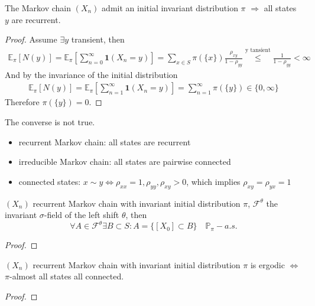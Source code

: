 \begin{theorem}
	The Markov chain $(X_n)$ admit an initial invariant distribution $\pi$ $\Rightarrow$ all states $y$ are recurrent.
\end{theorem}
\begin{proof}
	Assume $\exists y$ transient, then 
	\begin{align*}
		\mathbb{E}_\pi[N(y)] = \mathbb{E}_\pi[\sum_{n = 0}^\infty \textbf{1}(X_n = y)] = \sum_{x \in S} \pi(\{x\})\frac{\rho_{xy}}{1 - \rho_{yy}} \overset{\text{y tansient}}{\leq}\frac{1}{1-\rho_{yy}} < \infty
	\end{align*}
	And by the invariance of the initial distribution
	\begin{align*}
		\mathbb{E}_\pi[N(y)] = \mathbb{E}_\pi[\sum_{n = 1}^\infty \textbf{1}(X_n = y)] = \sum_{n = 1}^\infty \pi(\{y\}) \in \{0, \infty\}
	\end{align*}
	Therefore $\pi(\{y\}) = 0$. 
\end{proof}
\begin{remark}
The converse is not true.	
\end{remark}

\begin{definition}\quad
\begin{itemize}
	\item recurrent Markov chain: all states are recurrent
	\item irreducible Markov chain: all states are pairwise connected
	\item connected states: $x \sim y \Leftrightarrow \rho_{xx} = 1, \rho_{yy}, \rho_{xy} > 0$, which implies $\rho_{xy} = \rho_{yx}= 1$
\end{itemize}
\end{definition}

\begin{theorem}
	$(X_n)$ recurrent Markov chain with invariant initial distribution $\pi$, $\mathcal{F}^\theta$ the invariant $\sigma$-field of the left shift $\theta$, then
	\begin{equation*}
		\forall A \in \mathcal{F}^\theta \exists B \subset S: A = \{[X_0] \subset B\} \quad \mathbb{P}_\pi-a.s.
	\end{equation*}
\end{theorem}
\begin{proof}
\end{proof}

\begin{corollary}
$(X_n)$ recurrent Markov chain with invariant initial distribution $\pi$ is ergodic $\Leftrightarrow$ $\pi$-almost all states all connected.
\end{corollary}
\begin{proof}
\end{proof}





